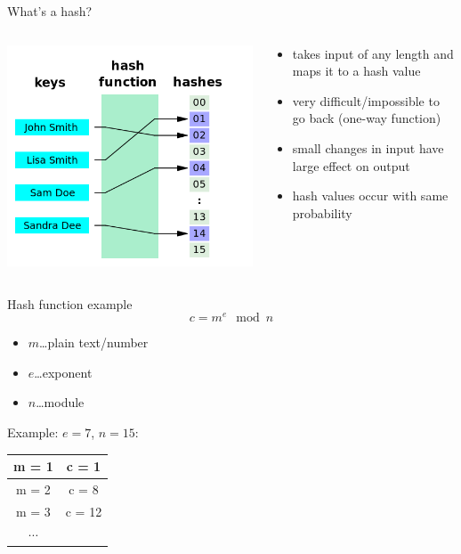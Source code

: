 \documentclass[12pt]{beamer}
\theoremstyle{definition}
\numberwithin{equation}{section}
\begin{document}
\begin{frame}{What's a hash?}
  \begin{columns}
    \begin{column}{.5\textwidth}
    \includegraphics[width=\textwidth]{hash_wikipedia}
    \end{column}
    \begin{column}{.5\textwidth}
      \begin{itemize}
      \item takes input of any length and maps it to a hash value
      \item very difficult/impossible to go back (one-way function)
      \item small changes in input have large effect on output
      \item hash values occur with same probability
      \end{itemize}
    \end{column}
    \end{columns}
  \end{frame}

\begin{frame}{Hash function example}
  \begin{equation*}
    c=m^e \mod n
  \end{equation*}
  \begin{itemize}
  \item $m$\ldots plain text/number
  \item $e$\ldots exponent
  \item $n$\ldots module
  \end{itemize}
  Example: $e=7$, $n=15$:\qquad
  \begin{tabular}{c|c}
    \hline
    m = 1 & c = 1\\ \hline
    m = 2 & c = 8\\ \hline
    m = 3 & c = 12\\ \hline
    $\cdots$ & \\ \hline
  \end{tabular}
\end{frame}
\end{document}
